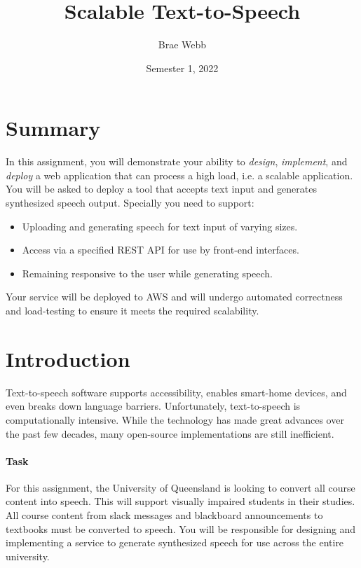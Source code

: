 \documentclass{csse4400}
\title{Scalable Text-to-Speech}
\author{Brae Webb}
\date{Semester 1, 2022}
\begin{document}
\maketitle

\section*{Summary}
In this assignment, you will demonstrate your ability to \textsl{design},
\textsl{implement}, and \textsl{deploy} a web application that can process a high load,
i.e. a scalable application.
You will be asked to deploy a tool that accepts text input and generates synthesized speech output.
Specially you need to support:
\begin{itemize}
    \item Uploading and generating speech for text input of varying sizes.
    \item Access via a specified REST API for use by front-end interfaces.
    \item Remaining responsive to the user while generating speech.
\end{itemize}

Your service will be deployed to AWS and will undergo automated correctness and load-testing to ensure it meets the required scalability.

\section{Introduction}
Text-to-speech software supports accessibility,
enables smart-home devices,
and even breaks down language barriers.
Unfortunately, text-to-speech is computationally intensive.
While the technology has made great advances over the past few decades,
many open-source implementations are still inefficient.

\paragraph{Task}
For this assignment,
the University of Queensland is looking to convert all course content into speech.
This will support visually impaired students in their studies.
All course content from slack messages and blackboard announcements to textbooks must be converted to speech.
You will be responsible for designing and implementing a service to generate synthesized speech for use across the entire university.
\end{document}
